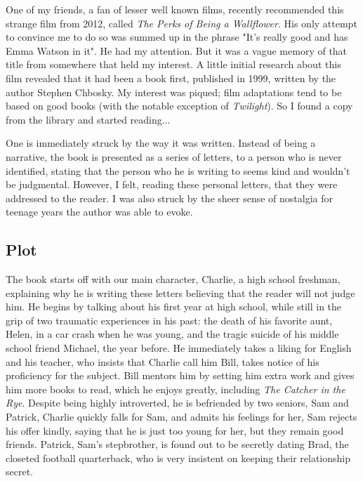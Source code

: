 

	One of my friends, a fan of lesser well known films, recently recommended this strange film from 2012, called \textit{The Perks of Being a Wallflower}. His only attempt to convince me to do so was summed up in the phrase "It's really good and has Emma Watson in it". He had my attention. But it was a vague memory of that title from somewhere that held my interest. A little initial research about this film revealed that it had been a book first, published in 1999, written by the author Stephen Chbosky. My interest was piqued; film adaptations tend to be based on good books (with the notable exception of \textit{Twilight}). So I found a copy from the library and started reading...

	One is immediately struck by the way it was written. Instead of being a narrative, the book is presented as a series of letters, to a person who is never identified, stating that the person who he is writing to seems kind and wouldn't be judgmental. However, I felt, reading these personal letters, that they were addressed to the reader. I was also struck by the sheer sense of nostalgia for teenage years the author was able to evoke.

\subsection{Plot}

	The book starts off with our main character, Charlie, a high school freshman, explaining why he is writing these letters believing that the reader will not judge him. He begins by talking about his first year at high school, while still in the grip of two traumatic experiences in his past: the death of his favorite aunt, Helen, in a car crash when he was young, and the tragic suicide of his middle school friend Michael, the year before. He immediately takes a liking for English and his teacher, who insists that Charlie call him Bill, takes notice of his proficiency for the subject. Bill mentors him by setting him extra work and gives him more books to read, which he enjoys greatly, including \textit{The Catcher in the Rye}. Despite being highly introverted, he is befriended by two seniors, Sam and Patrick, Charlie quickly falls for Sam, and admits his feelings for her, Sam rejects his offer kindly, saying that he is just too young for her, but they remain good friends. Patrick, Sam's stepbrother, is found out to be secretly dating Brad, the closeted football quarterback, who is very insistent on keeping their relationship secret.

